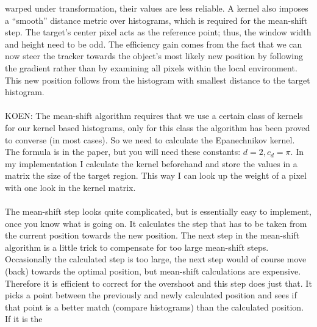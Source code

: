 \documentclass[a4paper,11pt]{article}
\begin{document}
		warped under transformation, their values are less reliable. A kernel
		also imposes a ``smooth'' distance metric over histograms, which is
		required for the mean-shift step. The target's center pixel acts as the
		reference point; thus, the window width and height need to be odd.
		The efficiency gain comes from the fact that we can now steer the
		tracker towards the object's most likely new position by following
		the gradient rather than by examining all pixels within the local
		environment. This new position follows from the histogram with
		smallest distance to the target histogram.
		\\ \\
		KOEN:
		The mean-shift algorithm requires that we use a certain class of kernels for
		our kernel based histograms, only for this class the algorithm has been proved
		to converse (in most cases). So we need to calculate the Epanechnikov kernel.
		The formula is in the paper, but you will need these constants: $d = 2, c_d = \pi$.
		In my implementation I calculate the kernel beforehand and store the values in a
		matrix the size of the target region. This way I can look up the weight of a pixel
		with one look in the kernel matrix.
		\\ \\
		The mean-shift step looks quite complicated, but is essentially easy to implement,
		once you know what is going on. It calculates the step that has to be taken from
		the current position towards the new position. The next step in the mean-shift
		algorithm is a little trick to compensate for too large mean-shift steps. Occasionally
		the calculated step is too large, the next step would of course move (back) towards
		the optimal position, but mean-shift calculations are expensive. Therefore it is
		efficient to correct for the overshoot and this step does just that. It picks a
		point between the previously and newly calculated position and sees if that point
		is a better match (compare histograms) than the calculated position. If it is the
\end{document}
